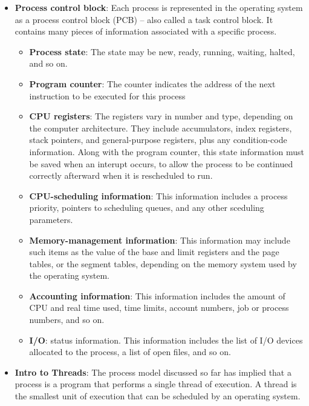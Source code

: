\documentclass{report}
\begin{document}
\begin{itemize}
        \item \textbf{Process control block}: Each process is represented in the operating system as a process control block (PCB) – also called a task control block.
            \bigbreak \noindent 
            It contains many pieces of information associated with a specific process.
            \begin{itemize}
                \item \textbf{Process state}: The state may be new, ready, running, waiting, halted, and so on.
                \item \textbf{Program counter}: The counter indicates the address of the next instruction to be executed for this process
                \item \textbf{CPU registers}: The registers vary in number and type, depending on the computer architecture. They include accumulators, index registers, stack pointers, and general-purpose registers, plus any condition-code information. Along with the program counter, this state information must be saved when an interupt occurs, to allow the process to be continued correctly afterward when it is rescheduled to run.
                \item \textbf{CPU-scheduling information}: This information includes a process priority, pointers to scheduling queues, and any other sceduling parameters.
                \item \textbf{Memory-management information}: This information may include such items as the value of the base and limit registers and the page tables, or the segment tables, depending on the memory system used by the operating system.
                \item \textbf{Accounting information}: This information includes the amount of CPU and real time used, time limits, account numbers, job or process numbers, and so on.
                \item \textbf{I/O}: status information. This information includes the list of I/O devices allocated to the process, a list of open files, and so on.
            \end{itemize}
        \item \textbf{Intro to Threads}: The process model discussed so far has implied that a process is a program that performs a single thread of execution.
            \bigbreak \noindent 
            A thread is the smallest unit of execution that can be scheduled by an operating system.
            \begin{itemize}

\end{itemize}
\end{itemize}
\end{document}
